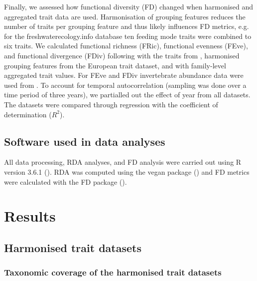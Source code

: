 \documentclass[12pt]{article}
\begin{document}
Finally, we assessed how functional diversity (FD) changed when harmonised and aggregated trait data are used. Harmonisation of grouping features reduces the number of traits per grouping feature and thus likely influences FD metrics, e.g. for the freshwaterecology.info database ten feeding mode traits were combined to six traits. We calculated functional richness (FRic), functional evenness (FEve), and functional divergence (FDiv) following \citet{villegerNewMultidimensionalFunctional2008a} with the traits from \citet{szocs_effects_2014}, harmonised grouping features from the European trait dataset, and with family-level aggregated trait values. For FEve and FDiv invertebrate abundance data were used from \citet{szocs_effects_2014}. To account for temporal autocorrelation (sampling was done over a time period of three years), we partialled out the effect of year from all datasets. The datasets were compared through regression with the coefficient of determination ($R^2$).



\subsection*{Software used in data analyses}

All data processing, RDA analyses, and FD analysis were carried out using R version 3.6.1 (\cite{cite_R}). RDA was computed using the vegan package (\cite{cite_vegan}) and FD metrics were calculated with the FD package (\cite{cite_FD}).

\newpage


\section*{Results}

\subsection*{Harmonised trait datasets}

\subsubsection*{Taxonomic coverage of the harmonised trait datasets}
\end{document}
